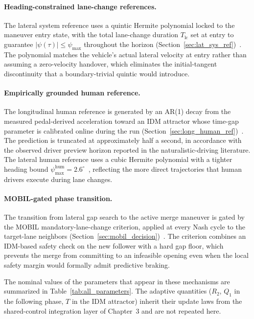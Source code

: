 \documentclass[12pt,a4paper,oneside]{report}
\begin{document}
\paragraph{Heading-constrained lane-change references.} The lateral system reference uses a quintic Hermite polynomial locked to the maneuver entry state, with the total lane-change duration $T_{\text{lc}}$ set at entry to guarantee $|\psi(\tau)| \leq \psi_{\max}$ throughout the horizon (Section~\ref{sec:lat_sys_ref})~\cite{guHumanlikeMotionPlanning2014}. The polynomial matches the vehicle's actual lateral velocity at entry rather than assuming a zero-velocity handover, which eliminates the initial-tangent discontinuity that a boundary-trivial quintic would introduce.

\paragraph{Empirically grounded human reference.} The longitudinal human reference is generated by an AR(1) decay from the measured pedal-derived acceleration toward an IDM attractor whose time-gap parameter is calibrated online during the run (Section~\ref{sec:long_human_ref})~\cite{fladCooperativeSharedControl2017, naTwoNashequilibriumbasedSteering2022, zhangBayesianCalibrationIntelligent2024}. The prediction is truncated at approximately half a second, in accordance with the observed driver preview horizon reported in the naturalistic-driving literature. The lateral human reference uses a cubic Hermite polynomial with a tighter heading bound $\psi_{\max}^{\text{hum}} = 2.6^\circ$~\cite{leeComprehensiveExaminationNaturalistic2004a}, reflecting the more direct trajectories that human drivers execute during lane changes.

\paragraph{MOBIL-gated phase transition.} The transition from lateral gap search to the active merge maneuver is gated by the MOBIL mandatory-lane-change criterion, applied at every Nash cycle to the target-lane neighbors (Section~\ref{sec:mobil_decision})~\cite{kestingGeneralLaneChangingModel2007}. The criterion combines an IDM-based safety check on the new follower with a hard gap floor, which prevents the merge from committing to an infeasible opening even when the local safety margin would formally admit predictive braking.

The nominal values of the parameters that appear in these mechanisms are summarized in Table~\ref{tab:all_parameters}. The adaptive quantities ($R_2$, $Q_1$ in the following phase, $T$ in the IDM attractor) inherit their update laws from the shared-control integration layer of Chapter~3 and are not repeated here.
\end{document}
